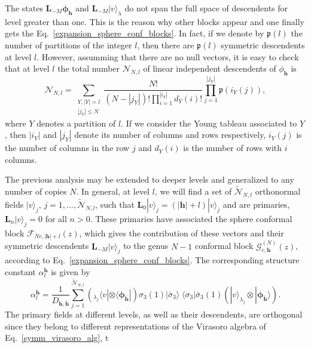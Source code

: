 \documentclass[a4paper,11pt]{article}
\begin{document}
\noindent The states 
$\boldsymbol{L}_{-M}\boldsymbol{\phi}_{\boldsymbol{h}}$ and $\boldsymbol{L}_{-M} |v\rangle_{\lambda}$ do not span the full space of descendents for level greater than one. This is the reason why
other blocks appear and one finally gets the  Eq.~\eqref{expansion_sphere_conf_blocks}. In fact, if we denote by $\mathfrak{p}(l)$
the number of partitions of the integer $l$, then there are $\mathfrak{p}(l)$ symmetric
descendents at level $l$. However, assumming that there are no null vectors, it is easy to check that 
at level $l$ the total number $\mathcal{N}_{N, l}$ of linear independent descendents of $\phi_{\boldsymbol{h}}$ is
\begin{equation}
 \mathcal{N}_{N, l}=\sum_{\substack{Y, |Y|=l \\ |j_Y|\leq N}}\frac{N!}{(N-|j_Y|)!
 \prod_{i=1}^{|i_Y|}d_Y(i)!}\prod_{j=1}^{|j_Y|}\mathfrak{p}(i_Y(j)),
\end{equation}
where $Y$ denotes a partition of $l$. If we consider the Young tableau
associated to $Y$, then $|i_Y|$ and  $|j_Y|$ denote its number of columns and
rows respectively, $i_Y(j)$ is the number of columns in the row $j$ and 
$d_Y(i)$ is the number of rows with $i$ columns.

The previous analysis may be extended to deeper levels and generalized to
any number of copies $N$. In general, at level $l$, we will find a set of 
$\tilde{\mathcal{N}}_{N,l}$ orthonormal fields $|v\rangle_j$, $j=1,\dots, \tilde{\mathcal{N}}_{N,l}$,
such that $\boldsymbol{L}_0 |v\rangle_j=(|\boldsymbol{h}|+l)|v\rangle_j$ and are primaries,
$\boldsymbol{L}_n|v\rangle_j=0$ for all $n>0$. These primaries have associated the 
sphere conformal block $\mathcal{F}_{Nc, |\boldsymbol{h}|+l}(z)$, which gives the 
contribution of these vectors and their symmetric descendents $\boldsymbol{L}_{-M}|v\rangle_j$
to the genus $N-1$ conformal block $\mathcal{G}_{c, \boldsymbol{h}}^{(N)}(z)$, 
according to Eq.~\eqref{expansion_sphere_conf_blocks}. The corresponding structure constant $\alpha_l^{\boldsymbol{h}}$
is given by
\begin{equation}
 \alpha_l^{\boldsymbol{h}}=\frac{1}{D_{\boldsymbol{h},\boldsymbol{\bar{h}}}}\sum_{j=1}^{\tilde{\mathcal{N}}_{N,l}}
 (_{\lambda_j}\langle v |\otimes \langle \boldsymbol{\phi}_{\boldsymbol{\bar{h}}}|)\sigma_{3}(1)|\bar{\sigma}_3\rangle \;\langle \sigma_{3}|\bar{\sigma}_3(1) (|v\rangle_{\lambda_j}\otimes |\boldsymbol{\phi}_{\boldsymbol{\bar{h}}}\rangle).
\end{equation}
The primary fields at 
different levels, as well as their descendents, are orthogonal
since they belong to different representations of the Virasoro algebra of Eq.~\eqref{symm_virasoro_alg}, t
\end{document}
